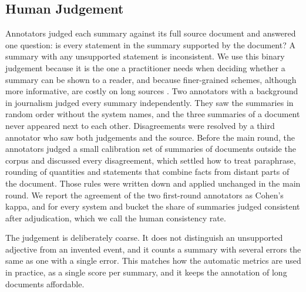 \subsection{Human Judgement}
Annotators judged each summary against its full source document and answered one question: is every statement in the summary supported by the document? A summary with any unsupported statement is inconsistent. We use this binary judgement because it is the one a practitioner needs when deciding whether a summary can be shown to a reader, and because finer-grained schemes, although more informative, are costly on long sources \citep{krishna2023longeval,liu2023rose}. Two annotators with a background in journalism judged every summary independently. They saw the summaries in random order without the system names, and the three summaries of a document never appeared next to each other. Disagreements were resolved by a third annotator who saw both judgements and the source. Before the main round, the annotators judged a small calibration set of summaries of documents outside the corpus and discussed every disagreement, which settled how to treat paraphrase, rounding of quantities and statements that combine facts from distant parts of the document. Those rules were written down and applied unchanged in the main round. We report the agreement of the two first-round annotators as Cohen's kappa, and for every system and bucket the share of summaries judged consistent after adjudication, which we call the human consistency rate.

The judgement is deliberately coarse. It does not distinguish an unsupported adjective from an invented event, and it counts a summary with several errors the same as one with a single error. This matches how the automatic metrics are used in practice, as a single score per summary, and it keeps the annotation of long documents affordable.

